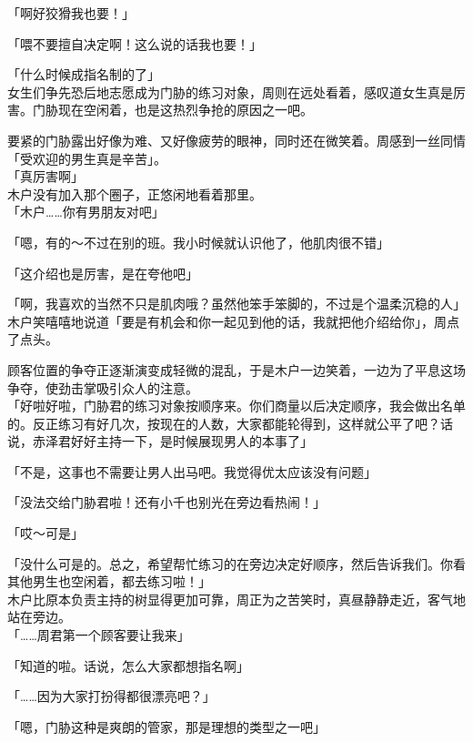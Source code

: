 「啊好狡猾我也要！」

「喂不要擅自决定啊！这么说的话我也要！」

「什么时候成指名制的了」\\

女生们争先恐后地志愿成为门胁的练习对象，周则在远处看着，感叹道女生真是厉害。门胁现在空闲着，也是这热烈争抢的原因之一吧。

要紧的门胁露出好像为难、又好像疲劳的眼神，同时还在微笑着。周感到一丝同情「受欢迎的男生真是辛苦」。\\

「真厉害啊」\\

木户没有加入那个圈子，正悠闲地看着那里。\\

「木户……你有男朋友对吧」

「嗯，有的～不过在别的班。我小时候就认识他了，他肌肉很不错」

「这介绍也是厉害，是在夸他吧」

「啊，我喜欢的当然不只是肌肉哦？虽然他笨手笨脚的，不过是个温柔沉稳的人」\\

木户笑嘻嘻地说道「要是有机会和你一起见到他的话，我就把他介绍给你」，周点了点头。

顾客位置的争夺正逐渐演变成轻微的混乱，于是木户一边笑着，一边为了平息这场争夺，使劲击掌吸引众人的注意。\\

「好啦好啦，门胁君的练习对象按顺序来。你们商量以后决定顺序，我会做出名单的。反正练习有好几次，按现在的人数，大家都能轮得到，这样就公平了吧？话说，赤泽君好好主持一下，是时候展现男人的本事了」

「不是，这事也不需要让男人出马吧。我觉得优太应该没有问题」

「没法交给门胁君啦！还有小千也别光在旁边看热闹！」

「哎～可是」

「没什么可是的。总之，希望帮忙练习的在旁边决定好顺序，然后告诉我们。你看其他男生也空闲着，都去练习啦！」\\

木户比原本负责主持的树显得更加可靠，周正为之苦笑时，真昼静静走近，客气地站在旁边。\\

「……周君第一个顾客要让我来」

「知道的啦。话说，怎么大家都想指名啊」

「……因为大家打扮得都很漂亮吧？」

「嗯，门胁这种是爽朗的管家，那是理想的类型之一吧」\\

